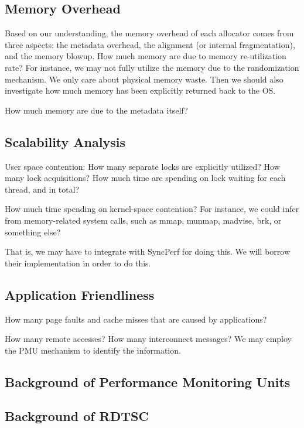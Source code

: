 \begin{comment}
Can we integrate the cache misses or page faults for each allocation and deallocation, so that we could identify the issue of DieHarder that invokes many unnecessary cache misses?

If we could correlate cache misses to each thread, then we could do this. 

If allocation and deallocation takes too much time, it could be caused by multiple reasons:

(1) First, it just takes a lot of instructions (could we find out the lapsed instructions for each thread?)
(2) It may be caused by not good algorithm? 
(3) It can be caused by lock contention?
(4) It can be caused by system call related contention?
\end{comment} 

\subsection{Memory Overhead}

Based on our understanding, the memory overhead of each allocator comes from three aspects: the metadata overhead, the alignment (or internal fragmentation), and the memory blowup. 
How much memory are due to memory re-utilization rate? For instance, we may not fully utilize the memory due to the randomization mechanism. We only care about physical memory waste. Then we should also investigate how much memory has been explicitly returned back to the OS. 

How much memory are due to the metadata itself? 

\subsection{Scalability Analysis} 

User space contention:
How many separate locks are explicitly utilized? 
How many lock acquisitions? How much time are spending on lock waiting for each thread, and in total?

How much time spending on kernel-space contention? For instance, we could infer from memory-related system calls, such as mmap, munmap, madvise, brk, or something else? 

That is, we may have to integrate with SyncPerf for doing this. We will borrow their implementation in order to do this. 

\subsection{Application Friendliness} 
How many page faults and cache misses that are caused by applications? 

How many remote accesses? How many interconnect messages? We may employ the PMU mechanism to identify the information.


\subsection{Background of Performance Monitoring Units}
\label{sec:pmu}

\subsection{Background of RDTSC}

\label{sec:rdtsc}

